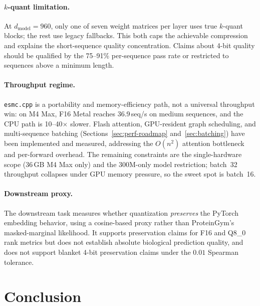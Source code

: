 \documentclass{article}
\begin{document}
\paragraph{$k$-quant limitation.}
At $d_{\text{model}}=960$, only one of seven weight matrices per layer uses true $k$-quant blocks; the rest use legacy fallbacks. This both caps the achievable compression and explains the short-sequence quality concentration. Claims about 4-bit quality should be qualified by the 75--91\% per-sequence pass rate or restricted to sequences above a minimum length.

\paragraph{Throughput regime.}
\texttt{esmc.cpp} is a portability and memory-efficiency path, not a universal throughput win: on M4 Max, F16 Metal reaches 36.9\,seq/s on medium sequences, and the CPU path is 10--40$\times$ slower. Flash attention, GPU-resident graph scheduling, and multi-sequence batching (Sections~\ref{sec:perf-roadmap} and~\ref{sec:batching}) have been implemented and measured, addressing the $O(n^2)$ attention bottleneck and per-forward overhead. The remaining constraints are the single-hardware scope (36\,GB M4 Max only) and the 300M-only model restriction; batch~32 throughput collapses under GPU memory pressure, so the sweet spot is batch~16.

\paragraph{Downstream proxy.}
The downstream task measures whether quantization \emph{preserves} the PyTorch embedding behavior, using a cosine-based proxy rather than ProteinGym's masked-marginal likelihood. It supports preservation claims for F16 and Q8\_0 rank metrics but does not establish absolute biological prediction quality, and does not support blanket 4-bit preservation claims under the $0.01$ Spearman tolerance.

\section{Conclusion}
\label{sec:conclusion}
\end{document}
